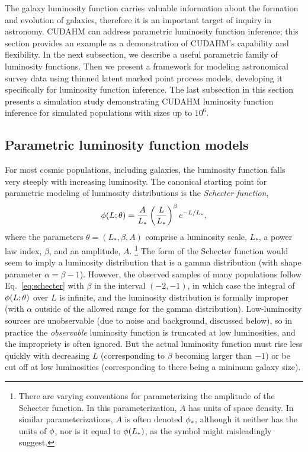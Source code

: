 The galaxy luminosity function carries valuable information about the formation and evolution of galaxies, therefore it is an important target of inquiry in astronomy.
CUDAHM can address parametric luminosity function inference; this section provides an example as a demonstration of CUDAHM's capability and flexibility.
In the next subsection, we describe a useful parametric family of luminosity functions.
Then we present a framework for modeling astronomical survey data using thinned latent marked point process models, developing it specifically for luminosity function inference.
The last subsection in this section presents a simulation study demonstrating CUDAHM luminosity function inference for simulated populations with sizes up to $10^6$.


\subsection{Parametric luminosity function models}
\label{sec:lfmodels}

For most cosmic populations, including galaxies, the luminosity function falls very steeply with increasing luminosity.
The canonical starting point for parametric modeling of luminosity distributions is the \emph{Schecter function},
\begin{equation}
\phi(L;\theta) =
  \frac{A}{L_*} \left(\frac{L}{L_*}\right)^{\beta} e^{-L/L_*},
\label{eq:schecter}
\end{equation}
where the parameters $\theta = (L_*,\beta, A)$ comprise a luminosity scale, $L_*$, a power law index, $\beta$, and an amplitude, $A$.%
\footnote{There are varying conventions for parameterizing the amplitude of the Schecter function.
In this parameterization, $A$ has units of space density.
In similar parameterizations, $A$ is often denoted $\phi_*$, although it neither has the units of $\phi$, nor is it equal to $\phi(L_*)$, as the symbol might misleadingly suggest.}
The form of the Schecter function would seem to imply a luminosity distribution that is a gamma distribution (with shape parameter $\alpha = \beta - 1$).
However, the observed samples of many populations follow Eq.~\ref{eq:schecter} with $\beta$ in the interval $(-2,-1)$, in which case the integral of $\phi(L;\theta)$ over $L$ is infinite, and the luminosity distribution is formally improper (with $\alpha$ outside of the allowed range for the gamma distribution).
Low-luminosity sources are unobservable (due to noise and background, discussed below), so in practice the \emph{observable} luminosity function is truncated at low luminosities, and the impropriety is often ignored.
But the actual luminosity function must rise less quickly with decreasing $L$ (corresponding to $\beta$ becoming larger than $-1$) or be cut off at low luminosities (corresponding to there being a minimum galaxy size).

